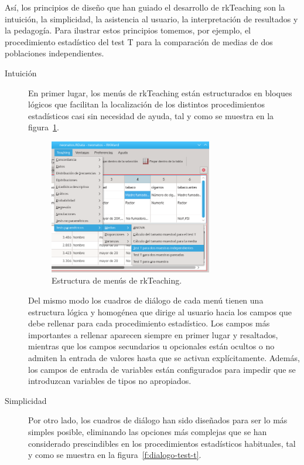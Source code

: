 \documentclass[a4paper,10pt,twoside]{article}
\newcommand{\rkteaching}{\textsf{rkTeaching}}
\begin{document}
Así, los principios de diseño que han guiado el desarrollo de \rkteaching{} son la intuición, la simplicidad, la
asistencia al usuario, la interpretación de resultados y la pedagogía.  
Para ilustrar estos principios tomemos, por ejemplo, el procedimiento estadístico del test T para la comparación de
medias de dos poblaciones independientes.

\begin{description}
\item[Intuición] En primer lugar, los menús de \rkteaching{} están estructurados en bloques lógicos que facilitan la
localización de los distintos procedimientos estadísticos casi sin necesidad de ayuda, tal y como se muestra en la
figura~\ref{f:menu-test-t}.

\begin{figure}[htbp!]
\centering
\includegraphics[width=0.7\textwidth]{img/menu_test_t.png}
\caption{Estructura de menús de \rkteaching.}
\label{f:menu-test-t}
\end{figure}

Del mismo modo los cuadros de diálogo de cada menú tienen una estructura lógica y homogénea que dirige al usuario hacia
los campos que debe rellenar para cada procedimiento estadístico. 
Los campos más importantes a rellenar aparecen siempre en primer lugar y resaltados, mientras que los campos secundarios
u opcionales están ocultos o no admiten la entrada de valores hasta que se activan explícitamente. 
Además, los campos de entrada de variables están configurados para impedir que se introduzcan variables de tipos no
apropiados. 

\item[Simplicidad] Por otro lado, los cuadros de diálogo han sido diseñados para ser lo más simples posible,
eliminando las opciones más complejas que se han considerado prescindibles en los procedimientos estadísticos
habituales, tal y como se muestra en la figura~\ref{f:dialogo-test-t}.


\end{description}
\end{document}
